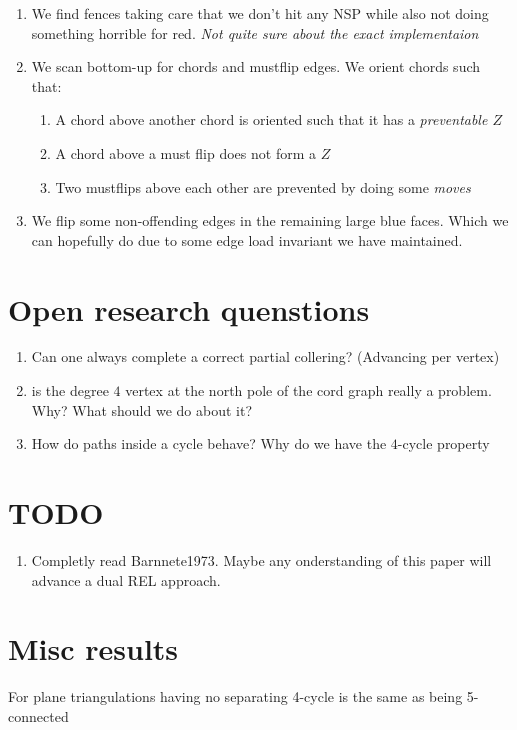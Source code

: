\begin{enumerate}
  \item We find fences taking care that we don't hit any NSP while also not doing something horrible for red. \emph{Not quite sure about the exact implementaion}
  \item We scan bottom-up for chords and mustflip edges. We orient chords such that:
  \begin{enumerate}
    \item A chord above another chord is oriented such that it has a \emph{preventable $Z$}
    \item A chord above a must flip does not form a $Z$
    \item Two mustflips above each other are prevented by doing some \emph{moves}
  \end{enumerate}

  \item We flip some non-offending edges in the remaining large blue faces. Which we can hopefully do due to some edge load invariant we have maintained.
\end{enumerate}


\section{Open research quenstions}
  \begin{enumerate}
    \item Can one always complete a correct partial collering? (Advancing per vertex)
    \item is the degree $4$ vertex at the north pole of the cord graph really a problem. Why? What should we do about it?
    \item How do paths inside a cycle behave? Why do we have the $4$-cycle property
  \end{enumerate}

\section{TODO}
  \begin{enumerate}
    \item   Completly read Barnnete1973. Maybe any onderstanding of this paper will advance a dual REL approach.
  \end{enumerate}



\section{Misc results}
  \begin{lemma}
    \label{lm:5connIsNoSep4C}
    For plane triangulations having no separating 4-cycle is the same as being 5-connected
  \end{lemma}

